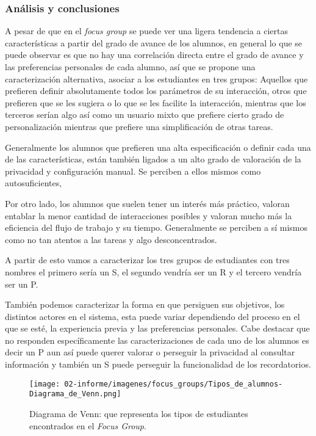     \subsubsection{Análisis y conclusiones}
    \par A pesar de que en el \textit{focus group} se puede ver una ligera tendencia a ciertas características a partir del grado de avance de los alumnos, en general lo que se puede observar es que no hay una correlación directa entre el grado de avance y las preferencias personales de cada alumno, así que se propone una caracterización alternativa, asociar a los estudiantes en tres grupos: Aquellos que prefieren definir absolutamente todos los parámetros de su interacción, otros que prefieren que se les sugiera o lo que se les facilite la interacción, mientras que los terceros serían algo así como un usuario mixto que prefiere cierto grado de personalización mientras que prefiere una simplificación de otras tareas.
    \par Generalmente los alumnos que prefieren una alta especificación o definir cada una de las características, están también ligados a un alto grado de valoración de la privacidad y configuración manual. Se perciben a ellos mismos como autosuficientes,
    \par Por otro lado, los alumnos que suelen tener un interés más práctico, valoran entablar la menor cantidad de interacciones posibles y valoran mucho más la eficiencia del flujo de trabajo y su tiempo. Generalmente se perciben a sí mismos como no tan atentos a las tareas y algo desconcentrados.
    \par A partir de esto vamos a caracterizar los tres grupos de estudiantes con tres nombres el primero sería un \acrfull{S}, el segundo vendría ser un \acrfull{R} y el tercero vendría ser un \acrfull{P}.
    \par También podemos caracterizar la forma en que persiguen sus objetivos, los distintos actores en el sistema, esta puede variar dependiendo del proceso en el que se esté, la experiencia previa y las preferencias personales. Cabe destacar que no responden específicamente las caracterizaciones de cada uno de los alumnos es decir un \acrshort{P} aun así puede querer valorar o perseguir la privacidad al consultar información y también un \acrshort{S} puede perseguir la funcionalidad de los recordatorios.
    \begin{figure}[h]
        \centering
        \texttt{[image: 02-informe/imagenes/focus\_groups/Tipos\_de\_alumnos-Diagrama\_de\_Venn.png]}
        \caption{Diagrama de Venn: que representa los tipos de estudiantes encontrados en el \textit{Focus Group}.}
        \label{fig:alumnosVenn}
    \end{figure}

